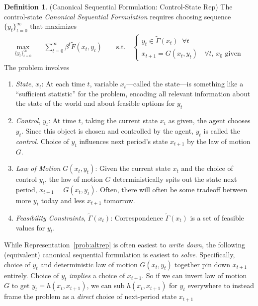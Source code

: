 \documentclass[12pt]{article}
\numberwithin{equation}{section} %
\theoremstyle{plain}
\theoremstyle{definition}
\newtheorem{defn}[thm]{Definition}
\theoremstyle{remark}
\newcommand{\sumtinfz}{\sum^\infty_{t=0}}
\begin{document}
\begin{defn}{(Canonical Sequential Formulation: Control-State Rep)}
\label{defn:sequential-altrep}
The control-state \emph{Canonical Sequential Formulation} requires
choosing sequence $\{y_{t}\}_{t=0}^\infty$ that maximizes
\begin{align}
  \label{prob:altrep}
  \max_{\{y_t\}_{t=0}^\infty}
  \quad &\sumtinfz \beta^t \tilde{F}(x_t,y_t)
  \qquad \text{s.t.}\quad
  \begin{cases}
  y_t \in \tilde{\Gamma}(x_t) \;\; \forall t\\
  \text{$x_{t+1} = G(x_t,y_t)$ $\;\forall t$, $x_0$ given}
  \end{cases}
\end{align}
The problem involves
\begin{enumerate}
  \item \emph{State}, $x_t$: At each time $t$, variable
    $x_t$---called the state---is something like a ``sufficient
    statistic'' for the problem, encoding all relevant information about
    the state of the world and about feasible options for $y_t$
  \item \emph{Control}, $y_{t}$: At time $t$, taking the current state
    $x_t$ as given, the agent chooses $y_{t}$.
    Since this object is chosen and controlled by the agent, $y_{t}$ is
    called the \emph{control}.
    Choice of $y_t$ influences next period's state $x_{t+1}$ by the law
    of motion $G$.
  \item \emph{Law of Motion} $G(x_t,y_t)$: Given the current state $x_t$
    and the choice of control $y_t$, the law of motion $G$
    deterministically spits out the state next period,
    $x_{t+1}=G(x_t,y_t)$.  Often, there will often be some tradeoff
    between more $y_t$ today and less $x_{t+1}$ tomorrow.

  \item \emph{Feasibility Constraints}, $\tilde{\Gamma}(x_t)$:
    Correspondence $\tilde{\Gamma}(x_t)$ is a set of feasible values
    for $y_{t}$.
\end{enumerate}
While Representation~\ref{prob:altrep} is often easiest to
\emph{write down}, the following (equivalent) canonical sequential
formulation is easiest to \emph{solve}.
Specifically, choice of $y_t$ and deterministic law of motion
$G(x_t,y_t)$ together pin down $x_{t+1}$ entirely.
Choice of $y_t$ \emph{implies} a choice of $x_{t+1}$.  So if we can
invert law of motion $G$ to get $y_t=h(x_t,x_{t+1})$, we can sub
$h(x_t,x_{t+1})$ for $y_t$ everywhere to instead frame the problem as
a \emph{direct} choice of next-period state $x_{t+1}$
\end{defn}
\end{document}
